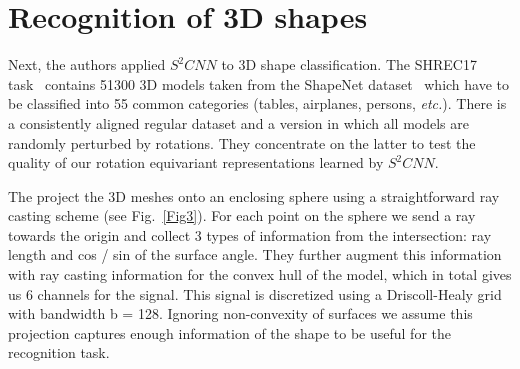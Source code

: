 \documentclass[10pt,twocolumn,letterpaper]{article}
\begin{document}
 \section{Recognition of 3D shapes}
 Next, the authors applied $S^2CNN$ to 3D shape classification. The SHREC17 task~\cite{name6} contains 51300 3D models taken from the ShapeNet dataset~\cite{name7} which have to be classified into 55 common categories (tables, airplanes, persons, \emph{etc.}). There is a consistently aligned regular dataset and a version in which all models are randomly perturbed by rotations. They concentrate on the latter to test the quality of our rotation equivariant representations learned by $S^2CNN$. 
\par The project the 3D meshes onto an enclosing sphere using a straightforward ray casting scheme (see Fig.~\ref{Fig3}). For each point on the sphere we send a ray towards the origin and collect 3 types of information from the intersection: ray length and cos / sin of the surface angle. They further augment this information with ray casting information for the convex hull of the model, which in total gives us 6 channels for the signal. This signal is discretized using a Driscoll-Healy grid~\cite{name8} with bandwidth b = 128. Ignoring non-convexity of surfaces we assume this projection
captures enough information of the shape to be useful for the recognition task.



\end{document}

